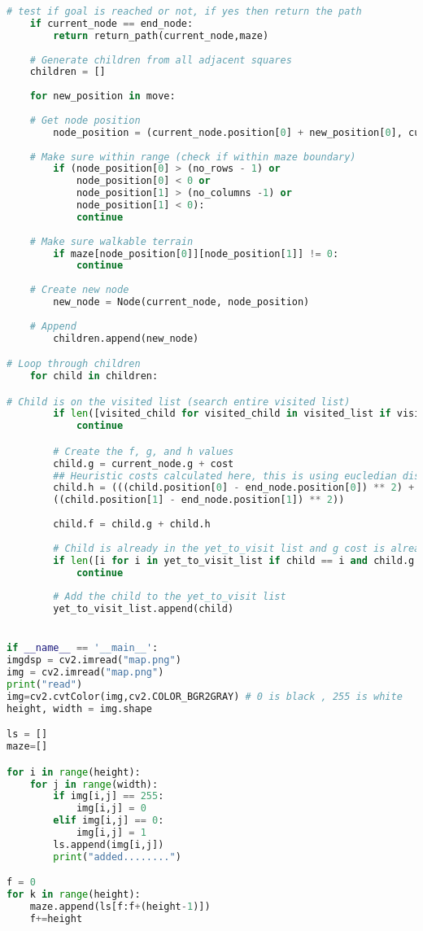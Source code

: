 \begin{appendices}
\begin{lstlisting}[language=Python]
	# test if goal is reached or not, if yes then return the path
	if current_node == end_node:
		return return_path(current_node,maze)
	
	# Generate children from all adjacent squares
	children = []
	
	for new_position in move:
	
	# Get node position
		node_position = (current_node.position[0] + new_position[0], current_node.position[1] + new_position[1])
	
	# Make sure within range (check if within maze boundary)
		if (node_position[0] > (no_rows - 1) or
			node_position[0] < 0 or
			node_position[1] > (no_columns -1) or
			node_position[1] < 0):
			continue
	
	# Make sure walkable terrain
		if maze[node_position[0]][node_position[1]] != 0:
			continue
	
	# Create new node
		new_node = Node(current_node, node_position)
	
	# Append
		children.append(new_node)

# Loop through children
	for child in children:

# Child is on the visited list (search entire visited list)
		if len([visited_child for visited_child in visited_list if visited_child == child]) > 0:
			continue

		# Create the f, g, and h values
		child.g = current_node.g + cost
		## Heuristic costs calculated here, this is using eucledian distance
		child.h = (((child.position[0] - end_node.position[0]) ** 2) +
		((child.position[1] - end_node.position[1]) ** 2))
		
		child.f = child.g + child.h
		
		# Child is already in the yet_to_visit list and g cost is already lower
		if len([i for i in yet_to_visit_list if child == i and child.g > i.g]) > 0:
			continue
		
		# Add the child to the yet_to_visit list
		yet_to_visit_list.append(child)


if __name__ == '__main__':
imgdsp = cv2.imread("map.png")
img = cv2.imread("map.png")
print("read")
img=cv2.cvtColor(img,cv2.COLOR_BGR2GRAY) # 0 is black , 255 is white
height, width = img.shape

ls = []
maze=[]

for i in range(height):
	for j in range(width):
		if img[i,j] == 255:
			img[i,j] = 0
		elif img[i,j] == 0:
			img[i,j] = 1
		ls.append(img[i,j])
		print("added........")

f = 0
for k in range(height):
	maze.append(ls[f:f+(height-1)])
	f+=height



\end{lstlisting}
\end{appendices}
